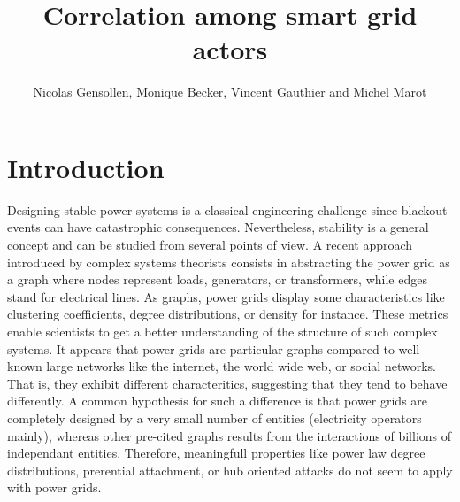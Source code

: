 \documentclass[conference]{IEEEtran}
\begin{document}
%
%
\title{Correlation among smart grid actors}

%
%
\author{Nicolas Gensollen, Monique Becker, Vincent Gauthier and Michel Marot  \\
}

\maketitle

%
%
\begin{abstract}

\end{abstract}

\IEEEpeerreviewmaketitle


%
%
\section{Introduction}
\label{sec:introduction}

Designing stable power systems is a classical engineering challenge since blackout events can have catastrophic consequences. Nevertheless, stability is a general concept and can be studied from several points of view. A recent approach introduced by complex systems theorists consists in abstracting the power grid as a graph where nodes represent loads, generators, or transformers, while edges stand for electrical lines. As graphs, power grids display some characteristics like clustering coefficients, degree distributions, or density for instance. These metrics enable scientists to get a better understanding of the structure of such complex systems. It appears that power grids are particular graphs compared to well-known large networks like the internet, the world wide web, or social networks. That is, they exhibit different characteritics, suggesting that they tend to behave differently. A common hypothesis for such a difference is that power grids are completely designed by a very small number of entities (electricity operators mainly), whereas other pre-cited graphs results from the interactions of billions of independant entities. Therefore, meaningfull properties like power law degree distributions, prerential attachment, or hub oriented attacks do not seem to apply with power grids.
\end{document}
